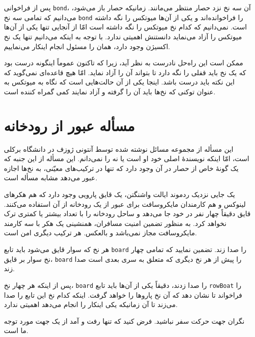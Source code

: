 \documentclass{book}
\begin{document}
    پس از فراخوانی {\tt bond}، آن سه نخ نزد حصار منتظر می‌مانند. زمانیکه حصار باز می‌شود، می‌دانیم که تمامی سه نخ {\tt bond} را فراخوانده‌اند و 
    یکی از آن‌ها میوتکس را نگه داشته است. نمی‌دانیم که  کدام نخ میوتکس را نگه داشته است امّا 
    از آنجایی تنها یکی از آن‌ها میوتکس را آزاد می‌نماید دانستنش اهمیتی ندارد. با توجه به اینکه می‌دانیم تنها یک نخ اکسیژن وجود دارد، 
    همان را مسئول انجام اینکار می‌نماییم. 

    ممکن است این راه‌حل نادرست به نظر آید، زیرا که تاکنون عموماً اینگونه درست بود که یک نخ باید قفلی را نگه دارد تا بتواند آن را آزاد نماید. 
    امّا هیچ قاعده‌ای نمی‌گوید که  این نکته باید درست باشد. اینجا یکی از آن حالت‌هایی است که نگاه به میوتکس به عنوان توکنی که نخ‌ها باید آن را گرفته و آزاد 
    نمایند کمی گمراه کننده است. 
    
    
\section {مسأله عبور از رودخانه}

    این مسأله از مجموعه مسائل نوشته شده توسط آنتونی ژوزف در دانشگاه برکلی
    است، امّا اینکه نویسندهٔ اصلی خود او است یا نه را نمی‌دانم. این مسأله از این جنبه که یک گونهٔ خاص از حصار در آن وجود دارد که تنها در ترکیب‌های 
    معیّنی، به نخ‌ها اجازه عبور می‌دهد مشابه مسأله  است. 

    یک جایی نزدیک ردموند ایالت واشنگتن، یک قایق پارویی وجود دارد که هم هکرهای لینوکس و 
    هم کارمندان مایکروسافت برای عبور از یک رودخانه از آن استفاده می‌کنند.  قایق دقیقاً چهار نفر در خود جا می‌دهد و ساحل رودخانه را با تعداد بیشتر یا کمتری ترک نخواهد کرد. 
    به منظور تضمین امنیت مسافران، همنشینی یک هکر با سه کارمند مایکروسافت مجاز نمی‌باشد و بالعکس. هر ترکیب دیگری امن است. 

    هر نخ که سوار قایق می‌شود باید تابع  {\tt board} را صدا زند. تضمین نمایید که تمامی چهار نخ سوار بر قایق،  {\tt board} را 
    پیش از هر نخ دیگری که متعلق به سری بعدی است صدا زند. 
    

    پس از اینکه هر چهار نخ،  {\tt board} را صدا زدند، دقیقاً یکی از آن‌ها باید تابع {\tt rowBoat} را فراخواند تا نشان دهد که آن نخ 
    پاروها را خواهد گرفت. اینکه کدام نخ این تابع را صدا می‌زند تا آن زمانیکه یکی اینکار را انجام می‌دهد اهمیتی ندارد. 

    نگران جهت حرکت سفر نباشید. فرض کنید که تنها رفت و آمد از یک جهت مورد توجه ما است. 
\end{document}

